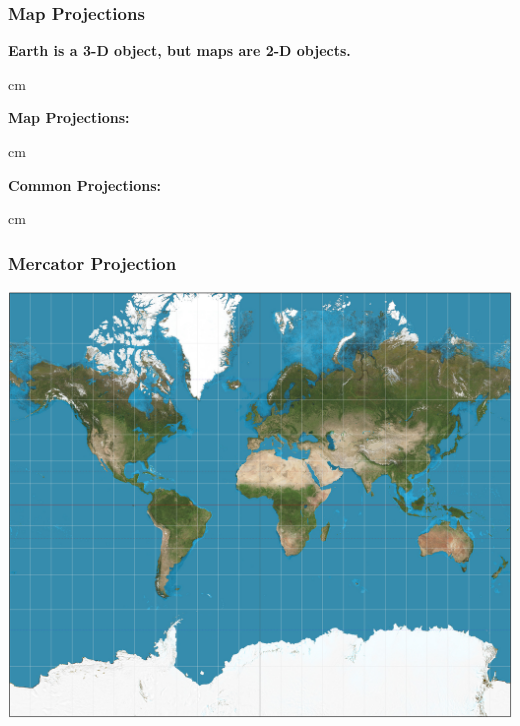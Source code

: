 \documentclass{beamer} %
\begin{document}
\begin{frame}\frametitle{Map Projections}
	\small
	
	\textbf{Earth is a 3-D object, but maps are 2-D objects.}  
	
	
	 cm
	
	\textbf{Map Projections:}  %
	
	
	
	 cm
	
	\textbf{Common Projections:}  %
	
	 cm
	
\end{frame}



\begin{frame}\frametitle{Mercator Projection}
	\includegraphics[width=0.9\linewidth]{mercator.jpg}
\end{frame}
\end{document}
